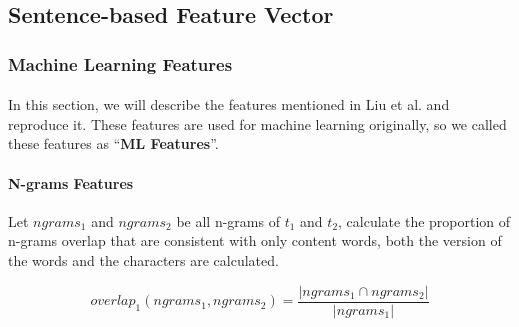 \documentclass[12pt]{article}
\begin{document}
\begin{CJK*}{UTF8}{bkai}
\begin{spacing}{1.77}

\subsection{Sentence-based Feature Vector}
\subsubsection{Machine Learning Features} \label{section:ml_features}
\paragraph{}
In this section, we will describe the features mentioned in Liu et al.\cite{liu_2016} and reproduce it. These features are used for machine learning originally, so we called these features as ``\textbf{ML Features}''.

\paragraph{N-grams Features}
Let $ngrams_1$ and $ngrams_2$ be all n-grams of $t_1$ and $t_2$, calculate the proportion of n-grams overlap that are consistent with only content words, both the version of the words and the characters are calculated.

\begin{equation}
  overlap_1(ngrams_1,ngrams_2)=\frac{|ngrams_1\cap ngrams_2|}{|ngrams_1|}
\end{equation}


\end{spacing}
\end{CJK*}
\end{document}

